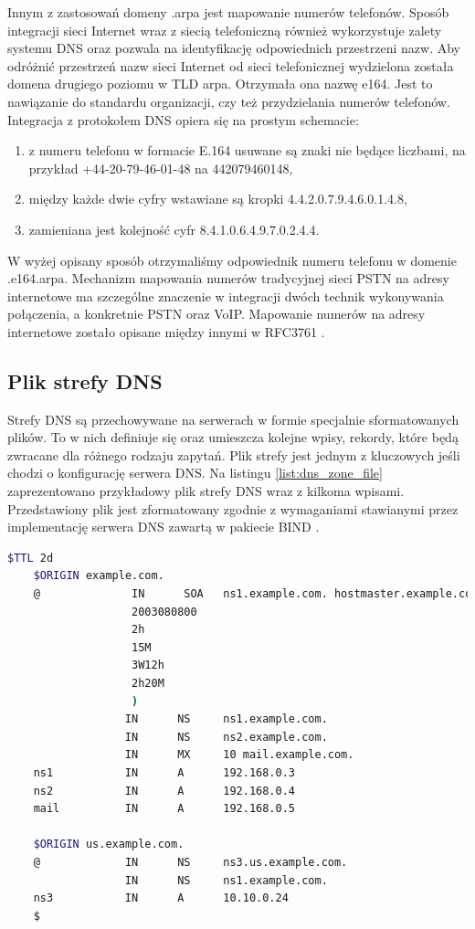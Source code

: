 Innym z zastosowań domeny .arpa jest mapowanie numerów telefonów. Sposób integracji sieci Internet wraz z siecią telefoniczną również
wykorzystuje zalety systemu DNS oraz pozwala na identyfikację odpowiednich przestrzeni nazw. Aby odróżnić przestrzeń nazw sieci
Internet od sieci telefonicznej wydzielona została domena drugiego poziomu w TLD arpa. Otrzymała ona nazwę e164. Jest to nawiązanie
do standardu organizacji, czy też przydzielania numerów telefonów. Integracja z protokołem DNS opiera się na prostym schemacie:
\begin{enumerate}
	\item z numeru telefonu w formacie E.164 usuwane są znaki nie będące liczbami, na przykład +44-20-79-46-01-48 na 442079460148,
	\item między każde dwie cyfry wstawiane są kropki 4.4.2.0.7.9.4.6.0.1.4.8,
	\item zamieniana jest kolejność cyfr 8.4.1.0.6.4.9.7.0.2.4.4.
\end{enumerate}

W wyżej opisany sposób otrzymaliśmy odpowiednik numeru telefonu w domenie .e164.arpa. Mechanizm mapowania numerów tradycyjnej sieci
PSTN na adresy internetowe ma szczególne znaczenie w integracji dwóch technik wykonywania połączenia, a konkretnie PSTN oraz VoIP.
Mapowanie numerów na adresy internetowe zostało opisane między innymi w RFC3761 \cite{RFC3761}.

\subsection{Plik strefy DNS}
Strefy DNS są przechowywane na serwerach w formie specjalnie sformatowanych plików. To w nich definiuje się oraz umieszcza kolejne
wpisy, rekordy, które będą zwracane dla różnego rodzaju zapytań. Plik strefy jest jednym z kluczowych jeśli chodzi o konfigurację
serwera DNS. Na listingu \ref{list:dns_zone_file} zaprezentowano przykładowy plik strefy DNS wraz z kilkoma wpisami. Przedstawiony
plik jest zformatowany zgodnie z wymaganiami stawianymi przez implementację serwera DNS zawartą w pakiecie
BIND \cite{Liu:2006:DB:1197828, isc, domain_example}.

\begin{lstlisting}[label={list:dns_zone_file},captionpos=b,caption=Przykładowy plik strefy DNS.,language=bash]
	$TTL 2d
	$ORIGIN example.com.
	@              IN      SOA   ns1.example.com. hostmaster.example.com. (
	               2003080800
	               2h
	               15M
	               3W12h
	               2h20M
	               )
	              IN      NS     ns1.example.com.
	              IN      NS     ns2.example.com.
	              IN      MX     10 mail.example.com.
	ns1           IN      A      192.168.0.3
	ns2           IN      A      192.168.0.4
	mail          IN      A      192.168.0.5

	$ORIGIN us.example.com.
	@             IN      NS     ns3.us.example.com.
	              IN      NS     ns1.example.com.
	ns3           IN      A      10.10.0.24
	$
\end{lstlisting}

